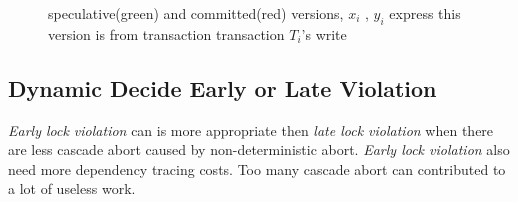 \documentclass[conference]{IEEEtran}
\begin{document}
\begin{figure}[htbp]
{  }
  \caption{speculative(green) and committed(red) versions, 
  ${x_i}$ , ${y_i}$ express this version is from transaction transaction ${T_i}$'s write
}
\label{fig:versions_example}
\end{figure}

\subsection {Dynamic Decide Early or Late Violation}
\emph{Early lock violation} can is more appropriate then \emph{late lock violation} when there are less cascade abort caused by non-deterministic abort.
\emph{Early lock violation} also need more dependency tracing costs.
Too many cascade abort can contributed to a lot of useless work.
\end{document}
